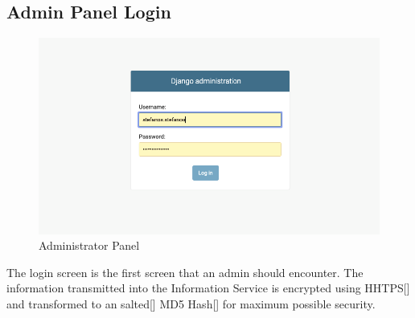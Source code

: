 		\subsection{Admin Panel Login}
			\begin{figure}[H]
				\iftrue
				\caption{Administrator Panel}
				\centering
				\includegraphics[scale=0.3]{figures/admin-panel-login}
				\fi
			\end{figure}
			The login screen is the first screen that an admin should encounter. The information transmitted into the Information Service
			is encrypted using HHTPS[\cite{rfc2818}] and transformed to an salted[\cite{MANBER1996171}] MD5 Hash[\cite{rfc1321}] for maximum 
			possible security.
